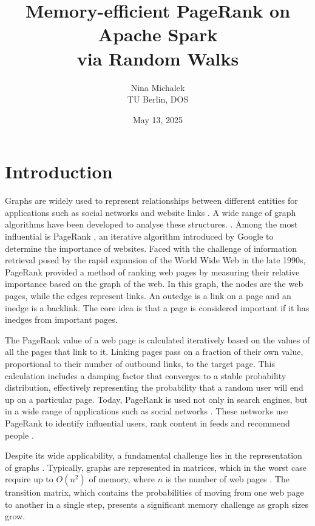 \documentclass[a4paper,12pt]{article}
\title{Memory-efficient PageRank on Apache Spark\\ via Random Walks}
\author{Nina Michalek\\TU Berlin, DOS}
\date{May 13, 2025}
\begin{document}
\maketitle


\section{Introduction}
 Graphs are widely used to represent relationships between different entities for applications such as social networks and website links \cite{zhang_distributed_2021}. 
A wide range of graph algorithms have been developed to analyse these structures. \cite{malewicz_pregel_2010}\cite{low_distributed_2012}\cite{koch_empirical_2016}. Among the most influential is PageRank \cite{page_pagerank_1999}, an iterative algorithm introduced by Google to determine the importance of websites. Faced with the challenge of information retrieval posed by the rapid expansion of the World Wide Web in the late 1990s, PageRank provided a method of ranking web pages by measuring their relative importance based on the graph of the web. In this graph, the nodes are the web pages, while the edges represent links. An outedge is a link on a page and an inedge is a backlink. The core idea is that a page is considered important if it has inedges from important pages.\par
The PageRank value of a web page is calculated iteratively based on the values of all the pages that link to it. Linking pages pass on a fraction of their own value, proportional to their number of outbound links, to the target page. This calculation includes a damping factor that converges to a stable probability distribution, effectively representing the probability that a random user will end up on a particular page.
Today, PageRank is used not only in search engines, but in a wide range of applications such as social networks \cite{wu_efficient_2024}. These networks use PageRank to identify influential users, rank content in feeds and recommend people \cite{weng_twitterrank_2010}.\par
Despite its wide applicability, a fundamental challenge lies in the representation of graphs \cite{liu_fast_2015}. Typically, graphs are represented in matrices, which in the worst case require up to $O(n^2)$ of memory, where $n$ is the number of web pages \cite{wu_efficient_2024}. The transition matrix, which contains the probabilities of moving from one web page to another in a single step, presents a significant memory challenge as graph sizes grow.\par
\end{document}
